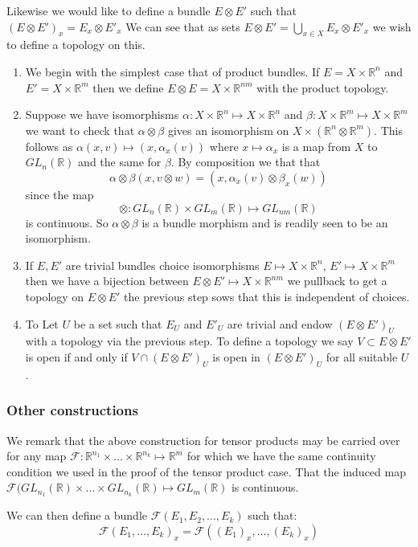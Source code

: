 \documentclass[a4paper,10pt]{article}
\theoremstyle{plain}%
\theoremstyle{definition}
\theoremstyle{remark}
\newcommand{\RR}{\mathbb{R}}
\begin{document}
Likewise we would like to define a bundle $E\otimes E'$ such that $(E\otimes E')_x=E_x\otimes E'_x$
We can see that as sets $E\otimes E'=\bigcup_{x\in X}E_x\otimes E'_x$ we wish to define a topology on this.
\begin{enumerate}
 \item We begin with the simplest case that of product bundles. If $E=X\times \RR^n$ and $E'=X\times \RR^m$ 
then we define $E\otimes E = X\times \RR^{n m}$ with the product topology.
 \item Suppose we have isomorphisms $\alpha:X\times\RR^n\mapsto X\times\RR^n$ and 
$\beta:X\times\RR^m\mapsto X\times\RR^m$ we want to check that $\alpha\otimes\beta$ gives an
isomorphism on $X\times(\RR^n\otimes\RR^m)$. This follows as $\alpha(x,v)\mapsto(x,\alpha_x(v))$ where 
$x\mapsto\alpha_x$ is a map from $X$ to $GL_n(\RR)$ and the same for $\beta$. By composition we that that
$$\alpha\otimes\beta(x,v\otimes w)=(x,\alpha_x(v)\otimes\beta_x(w))$$
since the map
$$\otimes:GL_n(\RR)\times GL_m(\RR)\mapsto GL_{n m}(\RR)$$
is continuous. So $\alpha\otimes\beta$ is a bundle morphism and is readily seen to be an isomorphism. 
 \item If $E, E'$ are trivial bundles choice isomorphisms $E\mapsto X\times\RR^n$, $E'\mapsto X\times\RR^m$
then we have a bijection between $E\otimes E'\mapsto X\times\RR^{n m}$ we pullback to get a topology 
on $E\otimes E'$ the previous step sows that this is independent of choices.
 \item To Let $U$ be a set such that $E_U$ and $E'_U$ are trivial and endow $(E\otimes E')_U$ with a topology via the previous
step. To define a topology we say $V\subset E\otimes E'$ is open if and only if $V\cap (E\otimes E')_U$ is open in $(E\otimes E')_U$
for all suitable $U$.
\end{enumerate}


\subsubsection{Other constructions}

We remark that the above construction for tensor products may be carried over for any map $\mathcal{F}:\RR^{n_1}\times\ldots\times\RR^{n_k}\mapsto\RR^m$
for which we have the same continuity condition we used in the proof of the tensor product case.
That the induced map $\mathcal{F}(GL_{n_1}(\RR)\times\ldots\times GL_{n_k}(\RR)\mapsto GL_m(\RR)$ is continuous.


We can then define a bundle $\mathcal{F}(E_1,E_2,\ldots,E_k)$ such that:
$$\mathcal{F}(E_1,\ldots,E_k)_x = \mathcal{F}((E_1)_x,\ldots,(E_k)_x)$$
\end{document}
